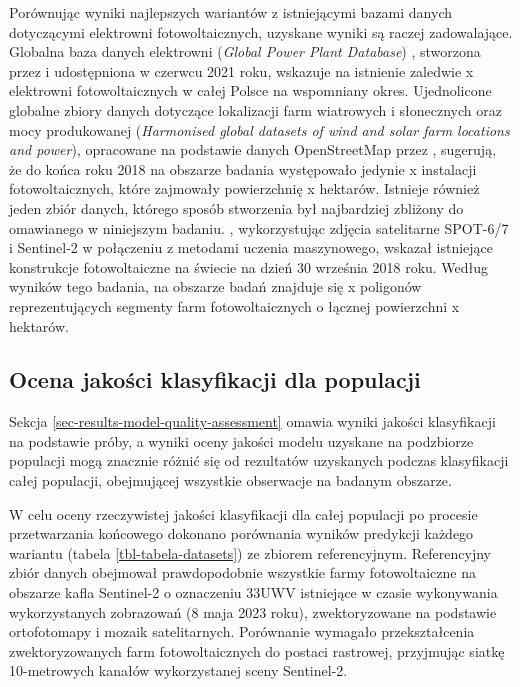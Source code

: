 \documentclass{amuthesis}
\begin{document}
Porównując wyniki najlepszych wariantów z istniejącymi bazami danych
dotyczącymi elektrowni fotowoltaicznych, uzyskane wyniki są raczej
zadowalające. Globalna baza danych elektrowni (\emph{Global Power Plant
Database}) \autocite{globalpowerplantdb_2021}, stworzona przez
\textcite{byers_2018_globalpowerplantdb} i udostępniona w czerwcu 2021
roku, wskazuje na istnienie zaledwie x elektrowni fotowoltaicznych w
całej Polsce na wspomniany okres. Ujednolicone globalne zbiory danych
dotyczące lokalizacji farm wiatrowych i słonecznych oraz mocy
produkowanej (\emph{Harmonised global datasets of wind and solar farm
locations and power}), opracowane na podstawie danych OpenStreetMap
przez \textcite{dunnet_2020_wind_solar}, sugerują, że do końca roku 2018
na obszarze badania występowało jedynie x instalacji fotowoltaicznych,
które zajmowały powierzchnię x hektarów. Istnieje również jeden zbiór
danych, którego sposób stworzenia był najbardziej zbliżony do omawianego
w niniejszym badaniu. \textcite{kruitwagen_2021_pv}, wykorzystując
zdjęcia satelitarne SPOT-6/7 i Sentinel-2 w połączeniu z metodami
uczenia maszynowego, wskazał istniejące konstrukcje fotowoltaiczne na
świecie na dzień 30 września 2018 roku. Według wyników tego badania, na
obszarze badań znajduje się x poligonów reprezentujących segmenty farm
fotowoltaicznych o łącznej powierzchni x hektarów.

\hypertarget{sec-population-quality-assessment}{%
\subsection{Ocena jakości klasyfikacji dla
populacji}\label{sec-population-quality-assessment}}

Sekcja \ref{sec-results-model-quality-assessment} omawia wyniki jakości
klasyfikacji na podstawie próby, a wyniki oceny jakości modelu uzyskane
na podzbiorze populacji mogą znacznie różnić się od rezultatów
uzyskanych podczas klasyfikacji całej populacji, obejmującej wszystkie
obserwacje na badanym obszarze.

W celu oceny rzeczywistej jakości klasyfikacji dla całej populacji po
procesie przetwarzania końcowego dokonano porównania wyników predykcji
każdego wariantu (tabela \ref{tbl-tabela-datasets}) ze zbiorem
referencyjnym. Referencyjny zbiór danych obejmował prawdopodobnie
wszystkie farmy fotowoltaiczne na obszarze kafla Sentinel-2 o oznaczeniu
33UWV istniejące w czasie wykonywania wykorzystanych zobrazowań (8 maja
2023 roku), zwektoryzowane na podstawie ortofotomapy i mozaik
satelitarnych. Porównanie wymagało przekształcenia zwektoryzowanych farm
fotowoltaicznych do postaci rastrowej, przyjmując siatkę 10-metrowych
kanałów wykorzystanej sceny Sentinel-2.
\end{document}
